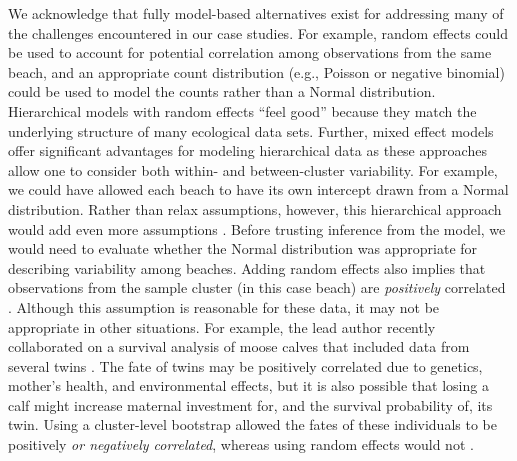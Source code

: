 \documentclass[fleqn,10pt]{wlpeerj} %
\begin{document}
We acknowledge that fully model-based alternatives exist for addressing many of the challenges encountered in our case studies. For example, random effects could be used to account for potential correlation among observations from the same beach, and an appropriate count distribution (e.g., Poisson or negative binomial) could be used to model the counts rather than a Normal distribution. Hierarchical models with random effects ``feel good'' because they match the underlying structure of many ecological data sets. Further, mixed effect models offer significant advantages for modeling hierarchical data as these approaches allow one to consider both within- and between-cluster variability. For example, we could have allowed each beach to have its own intercept drawn from a Normal distribution. Rather than relax assumptions, however, this hierarchical approach would add even more assumptions \citep{Murtaugh2007}. Before trusting inference from the model, we would need to evaluate whether the Normal distribution was appropriate for describing variability among beaches. Adding random effects also implies that observations from the sample cluster (in this case beach) are \emph{positively} correlated \citep{Fieberg2009}. Although this assumption is reasonable for these data, it may not be appropriate in other situations. For example, the lead author recently collaborated on a survival analysis of moose calves that included data from several twins \citep{Severud2019}. The fate of twins may be positively correlated due to genetics, mother's health, and environmental effects, but it is also possible that losing a calf might increase maternal investment for, and the survival probability of, its twin. Using a cluster-level bootstrap allowed the fates of these individuals to be positively \emph{or negatively correlated}, whereas using random effects would not \citep{Smith1984}.
\end{document}
